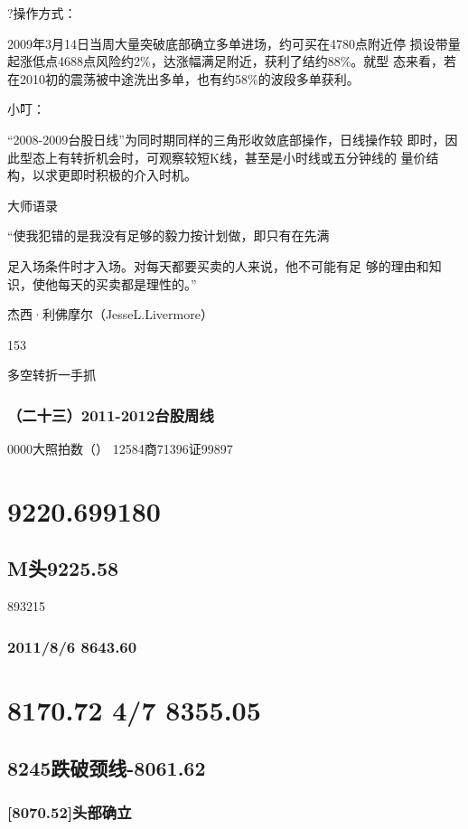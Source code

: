 \documentclass{article}
\begin{document}
?操作方式：

2009年3月14日当周大量突破底部确立多单进场，约可买在4780点附近停 损设带量起涨低点4688点风险约2\%，达涨幅满足附近，获利了结约88\%。就型 态来看，若在2010初的震荡被中途洗出多单，也有约58\%的波段多单获利。

小叮：

“2008-2009台股日线”为同时期同样的三角形收敛底部操作，日线操作较 即时，因此型态上有转折机会时，可观察较短K线，甚至是小时线或五分钟线的 量价结构，以求更即时积极的介入时机。

大师语录

“使我犯错的是我没有足够的毅力按计划做，即只有在先满

足入场条件时才入场。对每天都要买卖的人来说，他不可能有足 够的理由和知识，使他每天的买卖都是理性的。”

杰西·利佛摩尔（JesseL.Livermore）

153

\clearpage

多空转折一手抓

\subsubsection{（二十三）2011-2012台股周线}

0000大照拍数（） 12584商71396证99897

\section{9220.699180}

\subsection{M头9225.58}

893215

\subsubsection{2011/8/6 8643.60}

\section{8170.72 4/7 8355.05}

\subsection{8245跌破颈线-8061.62}

\subsubsection{[8070.52]头部确立}
\end{document}

